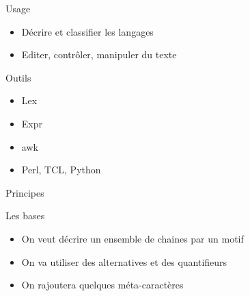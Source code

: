 \begin{frame}{\sectitle}
    \def\subsectitle{Usage}
    \begin{block}{\subsectitle}
        \begin{itemize}
            \item Décrire et classifier les langages
            \item Editer, contrôler, manipuler du texte
        \end{itemize}
    \end{block}

    \def\subsectitle{Outils}
    \begin{block}{\subsectitle}
        \begin{itemize}
            \item Lex
            \item Expr
            \item awk
            \item Perl, TCL, Python
        \end{itemize}
    \end{block}
\end{frame}

\def\sectitle{Principes}
\def\subsectitle{Les bases}
\begin{frame}{\sectitle}
    \begin{block}{\subsectitle}
        \begin{itemize}
            \item On veut décrire un ensemble de chaines par un motif
            \item On va utiliser des alternatives et des quantifieurs
            \item On rajoutera quelques méta-caractères
        \end{itemize}
    \end{block}
\end{frame}

